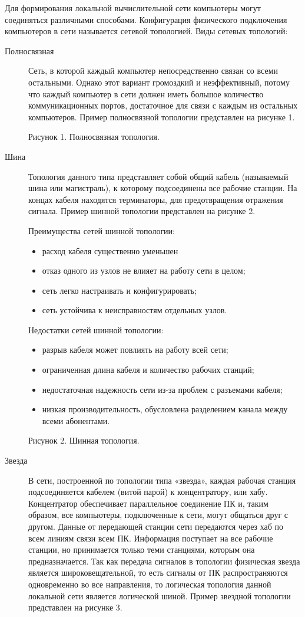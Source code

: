 Для формирования локальной вычислительной сети компьютеры могут соединяться различными способами. Конфигурация физического подключения компьютеров в сети называется сетевой топологией.
Виды сетевых топологий:
\begin{description}
\item[Полносвязная]
  Сеть, в которой каждый компьютер непосредственно связан со всеми остальными. Однако этот вариант громоздкий и неэффективный, потому что каждый компьютер в сети должен иметь большое количество коммуникационных портов, достаточное для связи с каждым из остальных компьютеров. Пример полносвязной топологии представлен на рисунке 1.


  Рисунок 1. Полносвязная топология.

\item[Шина]
  Топология данного типа представляет собой общий кабель (называемый шина или магистраль), к которому подсоединены все рабочие станции. На концах кабеля находятся терминаторы, для предотвращения отражения сигнала. Пример шинной топологии представлен на рисунке 2.

  Преимущества сетей шинной топологии:
  \begin{itemize}
  \item расход кабеля существенно уменьшен
  \item отказ одного из узлов не влияет на работу сети в целом;
  \item сеть легко настраивать и конфигурировать;
  \item сеть устойчива к неисправностям отдельных узлов.
  \end{itemize}
  Недостатки сетей шинной топологии:
  \begin{itemize}
  \item разрыв кабеля может повлиять на работу всей сети;
  \item ограниченная длина кабеля и количество рабочих станций;
  \item недостаточная надежность сети из-за проблем с разъемами кабеля;
  \item низкая производительность, обусловлена разделением канала между    всеми абонентами.
  \end{itemize}


  Рисунок 2. Шинная топология.

\item[Звезда]
  В сети, построенной по топологии типа «звезда», каждая рабочая станция подсоединяется кабелем (витой парой) к концентратору, или хабу. Концентратор обеспечивает параллельное соединение ПК и, таким образом, все компьютеры, подключенные к сети, могут общаться друг с другом.
  Данные от передающей станции сети передаются через хаб по всем линиям связи всем ПК. Информация поступает на все рабочие станции, но принимается только теми станциями, которым она предназначается. Так как передача сигналов в топологии физическая звезда является широковещательной, то есть сигналы от ПК распространяются одновременно во все направления, то логическая топология данной локальной сети является логической шиной. Пример звездной топологии представлен на рисунке 3.



\end{description}
